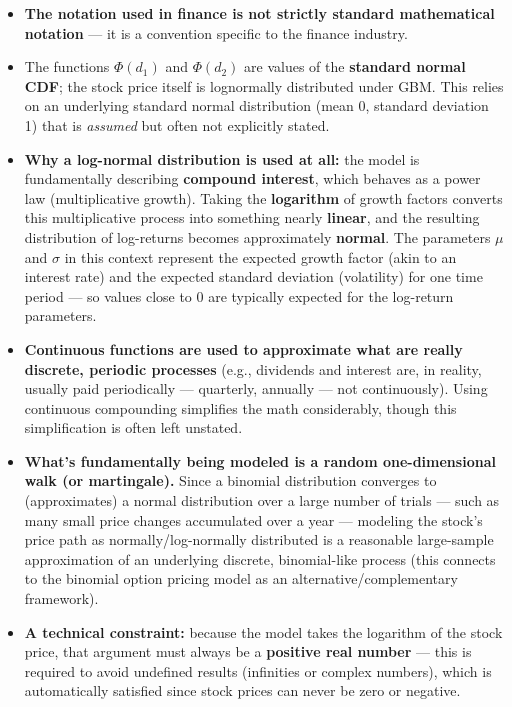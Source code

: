 \documentclass[12pt,openany]{book}
\theoremstyle{definition}
\theoremstyle{remark}
\begin{document}
\begin{itemize}
\item \textbf{The notation used in finance is not strictly standard mathematical notation} --- it is a convention specific to the finance industry.


\item The functions \(\Phi(d_1)\) and \(\Phi(d_2)\) are values of the \textbf{standard normal CDF}; the stock price itself is lognormally distributed under GBM. This relies on an underlying standard normal distribution (mean 0, standard deviation 1) that is \emph{assumed} but often not explicitly stated.


\item \textbf{Why a log-normal distribution is used at all:} the model is fundamentally describing \textbf{compound interest}, which behaves as a power law (multiplicative growth). Taking the \textbf{logarithm} of growth factors converts this multiplicative process into something nearly \textbf{linear}, and the resulting distribution of log-returns becomes approximately \textbf{normal}. The parameters \(\mu\) and \(\sigma\) in this context represent the expected growth factor (akin to an interest rate) and the expected standard deviation (volatility) for one time period --- so values close to 0 are typically expected for the log-return parameters.


\item \textbf{Continuous functions are used to approximate what are really discrete, periodic processes} (e.g., dividends and interest are, in reality, usually paid periodically --- quarterly, annually --- not continuously). Using continuous compounding simplifies the math considerably, though this simplification is often left unstated.


\item \textbf{What's fundamentally being modeled is a random one-dimensional walk (or martingale).} Since a binomial distribution converges to (approximates) a normal distribution over a large number of trials --- such as many small price changes accumulated over a year --- modeling the stock's price path as normally/log-normally distributed is a reasonable large-sample approximation of an underlying discrete, binomial-like process (this connects to the binomial option pricing model as an alternative/complementary framework).


\item \textbf{A technical constraint:} because the model takes the logarithm of the stock price, that argument must always be a \textbf{positive real number} --- this is required to avoid undefined results (infinities or complex numbers), which is automatically satisfied since stock prices can never be zero or negative.


\end{itemize}
\end{document}
